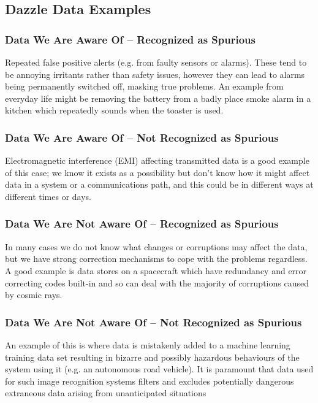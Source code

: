 \clearpage
\subsection{Dazzle Data Examples}

\subsubsection{Data We Are Aware Of -- Recognized as Spurious}
Repeated false positive alerts (e.g. from faulty sensors or alarms). These tend to be annoying irritants rather than safety issues, however they can lead to alarms being permanently switched off, masking true problems. An example from everyday life might be removing the battery from a badly place smoke alarm in a kitchen which repeatedly sounds when the toaster is used.

\subsubsection{Data We Are Aware Of -- Not Recognized as Spurious}
Electromagnetic interference (EMI) affecting transmitted data is a good example of this case; we know it exists as a possibility but don't know how it might affect data in a system or a communications path, and this could be in different ways at different times or days.

\subsubsection{Data We Are Not Aware Of -- Recognized as Spurious}
In many cases we do not know what changes or corruptions may affect the data, but we have strong correction mechanisms to cope with the problems regardless. A good example is data stores on a spacecraft which have redundancy and error correcting codes built-in and so can deal with the majority of corruptions caused by cosmic rays.

\subsubsection{Data We Are Not Aware Of -- Not Recognized as Spurious}
An example of this is where data is mistakenly added to a machine learning training data set resulting in bizarre and possibly hazardous behaviours of the system using it (e.g. an autonomous road vehicle). It is paramount that data used for such image recognition systems filters and excludes potentially dangerous extraneous data arising from unanticipated situations 

